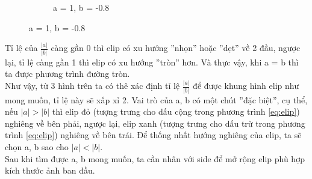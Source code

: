 \documentclass{article}
\begin{document}
\begin{figure}[!ht]
\begin{subfigure}[b]{0.3\linewidth}
    \caption{a = 1, b = -0.8}
  \end{subfigure}
\end{figure} \par
Tỉ lệ của $\frac{\left\lvert a \right\rvert}{\left\lvert b\right\rvert }$ càng gần 0 thì elip có xu hướng ''nhọn'' hoặc ''dẹt'' về 2 đầu, ngược lại, tỉ lệ càng gần 1 thì elip có xu hướng ''tròn'' hơn. Và thực vậy, khi a = b thì ta được phương trình đường tròn.\\
Như vậy, từ 3 hình trên ta có thê xác định tỉ lệ $\frac{\left\lvert a \right\rvert}{\left\lvert b\right\rvert }$ để được khung hình elip như mong muốn, tỉ lệ này sẽ xấp xỉ 2. Vai trò của a, b có một chút ''đặc biệt'', cụ thể, nếu $\left\lvert a \right\rvert > \left\lvert b \right\rvert$ thì elip đỏ (tượng trưng cho dấu cộng trong phương trình \ref{eq:elip}) nghiêng về bên phải, ngược lại, elip xanh (tượng trưng cho dấu trừ trong phương trình \ref{eq:elip}) nghiêng về bên trái. Để thống nhất hướng nghiêng của elip, ta sẽ chọn a, b sao cho $\left\lvert a \right\rvert < \left\lvert b \right\rvert$.\\
Sau khi tìm được a, b mong muốn, ta cần nhân với side để mở rộng elip phù hợp kích thước ảnh ban đầu.
\end{document}
